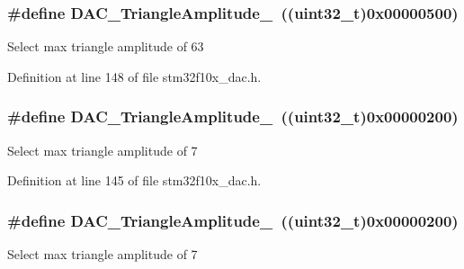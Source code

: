 \subsubsection[{\texorpdfstring{D\+A\+C\+\_\+\+Triangle\+Amplitude\+\_\+63}{DAC_TriangleAmplitude_63}}]{\setlength{\rightskip}{0pt plus 5cm}\#define D\+A\+C\+\_\+\+Triangle\+Amplitude\+\_~(({\bf uint32\+\_\+t})0x00000500)}\hypertarget{group___d_a_c__lfsrunmask__triangleamplitude_gaaae92dae9c4da55e29c645396825e36b}{}\label{group___d_a_c__lfsrunmask__triangleamplitude_gaaae92dae9c4da55e29c645396825e36b}
Select max triangle amplitude of 63 

Definition at line 148 of file stm32f10x\+\_\+dac.\+h.

\subsubsection[{\texorpdfstring{D\+A\+C\+\_\+\+Triangle\+Amplitude\+\_\+7}{DAC_TriangleAmplitude_7}}]{\setlength{\rightskip}{0pt plus 5cm}\#define D\+A\+C\+\_\+\+Triangle\+Amplitude\+\_~(({\bf uint32\+\_\+t})0x00000200)}\hypertarget{group___d_a_c__lfsrunmask__triangleamplitude_gad3f31de1277836df1109576a53c47e87}{}\label{group___d_a_c__lfsrunmask__triangleamplitude_gad3f31de1277836df1109576a53c47e87}
Select max triangle amplitude of 7 

Definition at line 145 of file stm32f10x\+\_\+dac.\+h.

\subsubsection[{\texorpdfstring{D\+A\+C\+\_\+\+Triangle\+Amplitude\+\_\+7}{DAC_TriangleAmplitude_7}}]{\setlength{\rightskip}{0pt plus 5cm}\#define D\+A\+C\+\_\+\+Triangle\+Amplitude\+\_~(({\bf uint32\+\_\+t})0x00000200)}\hypertarget{group___d_a_c__lfsrunmask__triangleamplitude_gad3f31de1277836df1109576a53c47e87}{}\label{group___d_a_c__lfsrunmask__triangleamplitude_gad3f31de1277836df1109576a53c47e87}
Select max triangle amplitude of 7 


